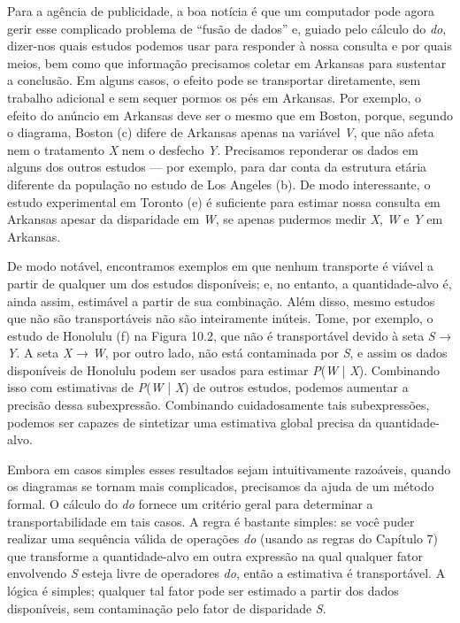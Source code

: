 \documentclass[11pt,a5paper,twoside]{book}
\begin{document}
Para a agência de publicidade, a boa notícia é que um computador pode agora gerir esse complicado problema de “fusão de dados” e, guiado pelo cálculo do \textit{do}, dizer-nos quais estudos podemos usar para responder à nossa consulta e por quais meios, bem como que informação precisamos coletar em Arkansas para sustentar a conclusão. Em alguns casos, o efeito pode se transportar diretamente, sem trabalho adicional e sem sequer pormos os pés em Arkansas. Por exemplo, o efeito do anúncio em Arkansas deve ser o mesmo que em Boston, porque, segundo o diagrama, Boston (c) difere de Arkansas apenas na variável \textit{V}, que não afeta nem o tratamento \textit{X} nem o desfecho \textit{Y}. Precisamos reponderar os dados em alguns dos outros estudos — por exemplo, para dar conta da estrutura etária diferente da população no estudo de Los Angeles (b). De modo interessante, o estudo experimental em Toronto (e) é suficiente para estimar nossa consulta em Arkansas apesar da disparidade em \textit{W}, se apenas pudermos medir \textit{X}, \textit{W} e \textit{Y} em Arkansas.

De modo notável, encontramos exemplos em que nenhum transporte é viável a partir de qualquer um dos estudos disponíveis; e, no entanto, a quantidade-alvo é, ainda assim, estimável a partir de sua combinação. Além disso, mesmo estudos que não são transportáveis não são inteiramente inúteis. Tome, por exemplo, o estudo de Honolulu (f) na Figura 10.2, que não é transportável devido à seta \textit{S} → \textit{Y}. A seta \textit{X} → \textit{W}, por outro lado, não está contaminada por \textit{S}, e assim os dados disponíveis de Honolulu podem ser usados para estimar \textit{P}(\textit{W} | \textit{X}). Combinando isso com estimativas de \textit{P}(\textit{W} | \textit{X}) de outros estudos, podemos aumentar a precisão dessa subexpressão. Combinando cuidadosamente tais subexpressões, podemos ser capazes de sintetizar uma estimativa global precisa da quantidade-alvo.

Embora em casos simples esses resultados sejam intuitivamente razoáveis, quando os diagramas se tornam mais complicados, precisamos da ajuda de um método formal. O cálculo do \textit{do} fornece um critério geral para determinar a transportabilidade em tais casos. A regra é bastante simples: se você puder realizar uma sequência válida de operações \textit{do} (usando as regras do Capítulo 7) que transforme a quantidade-alvo em outra expressão na qual qualquer fator envolvendo \textit{S} esteja livre de operadores \textit{do}, então a estimativa é transportável. A lógica é simples; qualquer tal fator pode ser estimado a partir dos dados disponíveis, sem contaminação pelo fator de disparidade \textit{S}.
\end{document}
